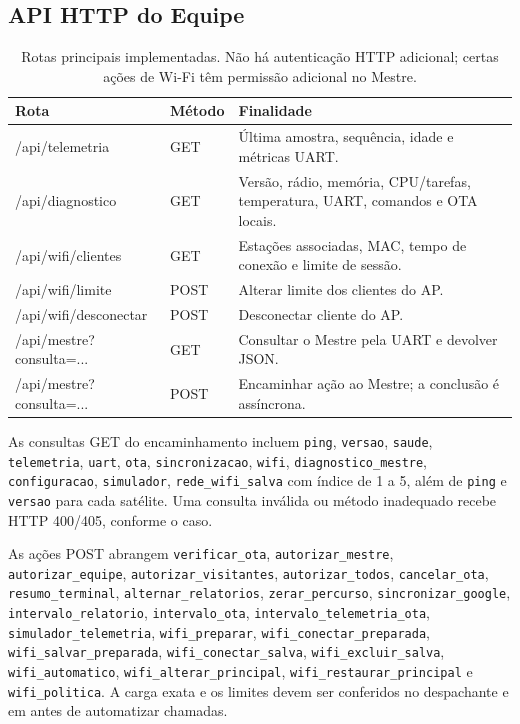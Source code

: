 \subsection{API HTTP do Equipe}\label{sec:api-equipe}
\begin{table}[htbp]\centering\small
\begin{tabularx}{\textwidth}{>{\ttfamily}p{4.5cm}p{1.4cm}X}
\toprule
\normalfont\bfseries Rota & \bfseries Método & \bfseries Finalidade\\
\midrule
/api/telemetria & GET & Última amostra, sequência, idade e métricas UART.\\
/api/diagnostico & GET & Versão, rádio, memória, CPU/tarefas, temperatura, UART, comandos e OTA locais.\\
/api/wifi/clientes & GET & Estações associadas, MAC, tempo de conexão e limite de sessão.\\
/api/wifi/limite & POST & Alterar limite dos clientes do AP.\\
/api/wifi/desconectar & POST & Desconectar cliente do AP.\\
/api/mestre?consulta=... & GET & Consultar o Mestre pela UART e devolver JSON.\\
/api/mestre?consulta=... & POST & Encaminhar ação ao Mestre; a conclusão é assíncrona.\\
\bottomrule
\end{tabularx}
\caption{Rotas principais implementadas. Não há autenticação HTTP adicional; certas ações de Wi-Fi têm permissão adicional no Mestre.}\label{tab:apis-web}
\end{table}

As consultas GET do encaminhamento incluem \texttt{ping}, \texttt{versao}, \texttt{saude}, \texttt{telemetria}, \texttt{uart}, \texttt{ota}, \texttt{sincronizacao}, \texttt{wifi}, \texttt{diagnostico\_mestre}, \texttt{configuracao}, \texttt{simulador}, \texttt{rede\_wifi\_salva} com índice de 1 a 5, além de \texttt{ping} e \texttt{versao} para cada satélite. Uma consulta inválida ou método inadequado recebe HTTP 400/405, conforme o caso.

As ações POST abrangem \texttt{verificar\_ota}, \texttt{autorizar\_mestre}, \texttt{autorizar\_equipe}, \texttt{autorizar\_visitantes}, \texttt{autorizar\_todos}, \texttt{cancelar\_ota}, \texttt{resumo\_terminal}, \texttt{alternar\_relatorios}, \texttt{zerar\_percurso}, \texttt{sincronizar\_google}, \texttt{intervalo\_relatorio}, \texttt{intervalo\_ota}, \texttt{intervalo\_telemetria\_ota}, \texttt{simulador\_telemetria}, \texttt{wifi\_preparar}, \texttt{wifi\_conectar\_preparada}, \texttt{wifi\_salvar\_preparada}, \texttt{wifi\_conectar\_salva}, \texttt{wifi\_excluir\_salva}, \texttt{wifi\_automatico}, \texttt{wifi\_alterar\_principal}, \texttt{wifi\_restaurar\_principal} e \texttt{wifi\_politica}. A carga exata e os limites devem ser conferidos no despachante e em  antes de automatizar chamadas.

